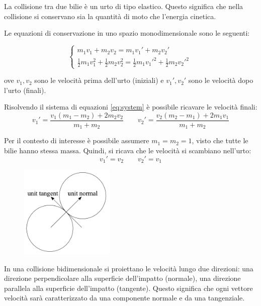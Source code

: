 \documentclass[12pt,a4paper]{report}
\begin{document}
\pagebreak

La collisione tra due bilie è un urto di tipo elastico. \cite{2DCollision} Questo significa che nella collisione si conservano sia la quantità di moto che l'energia cinetica.

Le equazioni di conservazione in uno spazio monodimensionale sono le seguenti:

\begin{equation} \label{eq:system}
    \begin{cases}
      m_1v_1 + m_2v_2 = m_1v_1' + m_2v_2'\\
      \frac{1}{2}m_1v_1^2 + \frac{1}{2}m_2v_2^2 = \frac{1}{2}m_1v_1'^2 + \frac{1}{2}m_2v_2'^2\
    \end{cases}
\end{equation}

ove $v_1, v_2$ sono le velocità prima dell'urto (iniziali) e $v_1', v_2'$ sono le velocità dopo l'urto (finali).

Risolvendo il sistema di equazioni \ref{eq:system} è possibile ricavare le velocità finali:
\[v_1' = \frac{v_1(m_1 - m_2) + 2m_2v_2}{m_1 + m_2} \qquad v_2' = \frac{v_2(m_2 - m_1) + 2m_1v_1}{m_1 + m_2}\]

Per il contesto di interesse è possibile assumere $m_1 = m_2 = 1$, visto che tutte le bilie hanno stessa massa.
Quindi, si ricava che le velocità si scambiano nell'urto:
\[v_1' = v_2 \qquad v_2' = v_1\]

\begin{figure}
  \begin{center}
  \includegraphics[width=0.4\textwidth]{2DCollision.png}
  \end{center}

\end{figure}

In una collisione bidimensionale si proiettano le velocità lungo due direzioni: una direzione perpendicolare alla superficie dell'impatto (normale), una direzione parallela alla superficie dell'impatto (tangente).
Questo significa che ogni vettore velocità sarà caratterizzato da una componente normale e da una tangenziale.
\end{document}
